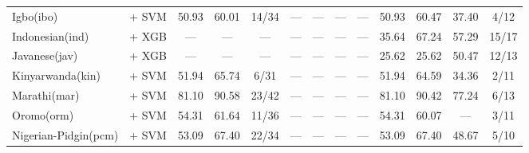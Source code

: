 \begin{table*}[h]
{\begin{tabular}{l|c|ccc|cccc|cccc}
            Igbo(ibo)                               & \citep{wang2024multilingual}   + SVM                                                         & 50.93                        & 60.01                        & 14/34                       & —             & —             & —                 & —             & 50.93         & 60.47         & 37.40             & 4/12          \\
            Indonesian(ind)                         & \citep{wang2024multilingual}   + XGB                                                         & —                            & —                            & —                           & —             & —             & —                 & —             & 35.64         & 67.24         & 57.29             & 15/17         \\
            Javanese(jav)                           & \citep{wang2024multilingual}   + XGB                                                         & —                            & —                            & —                           & —             & —             & —                 & —             & 25.62         & 25.62         & 50.47             & 12/13         \\
            Kinyarwanda(kin)                        & \citep{wang2024multilingual}  + SVM                                                          & 51.94                        & 65.74                        & 6/31                        & —             & —             & —                 & —             & 51.94         & 64.59         & 34.36             & 2/11          \\
            Marathi(mar)                            & \citep{wang2024multilingual}   + SVM                                                         & 81.10                        & 90.58                        & 23/42                       & —             & —             & —                 & —             & 81.10         & 90.42         & 77.24             & 6/13          \\
            Oromo(orm)                              & \citep{wang2024multilingual}    + SVM                                                        & 54.31                        & 61.64                        & 11/36                       & —             & —             & —                 & —             & 54.31         & 60.07         & —                 & 3/11          \\
            Nigerian-Pidgin(pcm)                    & \citep{wang2024multilingual}   + SVM                                                         & 53.09                        & 67.40                        & 22/34                       & —             & —             & —                 & —             & 53.09         & 67.40         & 48.67             & 5/10          \\

\end{tabular}}
\end{table*}
